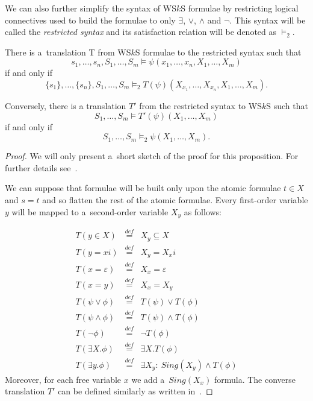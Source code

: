 We can also further simplify the syntax of WS$k$S formulae by restricting
logical connectives used to build the formulae to only $\exists$, $\vee$,
$\wedge$ and $\neg$. This syntax will be called
the \emph{restricted syntax} and its satisfaction relation will be denoted as
$\models_2$.
	
	\begin{prop}
There is a~translation T from WS$k$S formulae to the restricted syntax such that
\begin{equation}
s_1,\ldots,s_n,S_1,\ldots,S_m \models
\psi(x_1,\ldots,x_n,X_1,\ldots,X_m)
\end{equation} if and only if \begin{equation}\{s_1\},\ldots,\{s_n\},S_1,\ldots,S_m \models_2
T(\psi)(X_{x_1},\ldots,X_{x_n}, X_1,\ldots,X_m).
\end{equation}

 \noindent Conversely, there is a
translation $T'$ from the restricted syntax to WS$k$S such that \begin{equation}S_1,\ldots,S_m
\models T'(\psi)(X_1,\ldots,X_m)\end{equation} if and only if \begin{equation}S_1,\ldots,S_m \models_2
\psi(X_1,\ldots,X_m).\end{equation}
	\end{prop}
	\begin{proof}
We will only present a~short sketch of the proof for this proposition. For
further details see~\cite{tata}.

We can suppose that formulae will be built only upon the atomic formulae $t \in
X$ and $s = t$ and so flatten the rest of the atomic formulae. Every first-order
variable $y$ will be mapped to a~second-order variable $X_y$ as follows:
	
	 \begin{eqnarray}
	 T(y \in X) & \overset{\mathit{def}}{=} & X_y \subseteq X\\
	 T(y = xi) & \overset{\mathit{def}}{=} &  X_y = X_xi\\
	 T(x = \varepsilon) & \overset{\mathit{def}}{=} & X_x = \varepsilon\\
	 T(x = y) & \overset{\mathit{def}}{=} & X_x = X_y\\
	 T(\psi \vee \phi) & \overset{\mathit{def}}{=} & T(\psi) \vee T(\phi)\\
	 T(\psi \wedge \phi) & \overset{\mathit{def}}{=} & T(\psi) \wedge T(\phi)\\
	 T(\neg\phi) & \overset{\mathit{def}}{=} & \neg T(\phi)\\
	 T(\exists X.\phi) & \overset{\mathit{def}}{=} & \exists X.T(\phi)\\
	 T(\exists y.\phi) & \overset{\mathit{def}}{=} & \exists X_y:\ Sing(X_y) \wedge T(\phi)
	 \end{eqnarray}
	Moreover, for each free variable $x$ we add a~$Sing(X_x)$ formula. The converse translation $T'$ can be defined similarly as written
	in~\cite{tata}.
	\end{proof}
	
